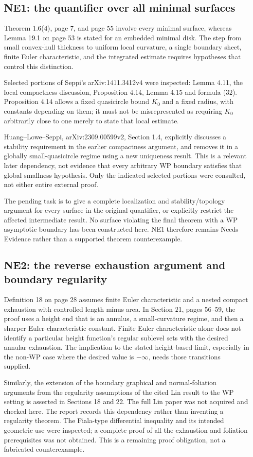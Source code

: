 \documentclass[10pt]{article}
\begin{document}
\subsection*{NE1: the quantifier over all minimal surfaces}
Theorem 1.6(4), page 7, and page 55 involve every minimal surface, whereas Lemma 19.1 on page 53 is stated for an embedded minimal disk. The step from small convex-hull thickness to uniform local curvature, a single boundary sheet, finite Euler characteristic, and the integrated estimate requires hypotheses that control this distinction.\par
Selected portions of Seppi’s arXiv:1411.3412v4 were inspected: Lemma 4.11, the local compactness discussion, Proposition 4.14, Lemma 4.15 and formula (32). Proposition 4.14 allows a fixed quasicircle bound \(K_0\) and a fixed radius, with constants depending on them; it must not be misrepresented as requiring \(K_0\) arbitrarily close to one merely to state that local estimate.\par
Huang–Lowe–Seppi, arXiv:2309.00599v2, Section 1.4, explicitly discusses a stability requirement in the earlier compactness argument, and removes it in a globally small-quasicircle regime using a new uniqueness result. This is a relevant later dependency, not evidence that every arbitrary WP boundary satisfies that global smallness hypothesis. Only the indicated selected portions were consulted, not either entire external proof.\par
The pending task is to give a complete localization and stability/topology argument for every surface in the original quantifier, or explicitly restrict the affected intermediate result. No surface violating the final theorem with a WP asymptotic boundary has been constructed here. NE1 therefore remains Needs Evidence rather than a supported theorem counterexample.\par
\subsection*{NE2: the reverse exhaustion argument and boundary regularity}
Definition 18 on page 28 assumes finite Euler characteristic and a nested compact exhaustion with controlled length minus area. In Section 21, pages 56–59, the proof uses a height end that is an annulus, a small-curvature regime, and then a sharper Euler-characteristic constant. Finite Euler characteristic alone does not identify a particular height function’s regular sublevel sets with the desired annular exhaustion. The implication to the stated height-based limit, especially in the non-WP case where the desired value is \(-\infty\), needs those transitions supplied.\par
Similarly, the extension of the boundary graphical and normal-foliation arguments from the regularity assumptions of the cited Lin result to the WP setting is asserted in Sections 18 and 22. The full Lin paper was not acquired and checked here. The report records this dependency rather than inventing a regularity theorem. The Fiala-type differential inequality and its intended geometric use were inspected; a complete proof of all the exhaustion and foliation prerequisites was not obtained. This is a remaining proof obligation, not a fabricated counterexample.\par
\end{document}
